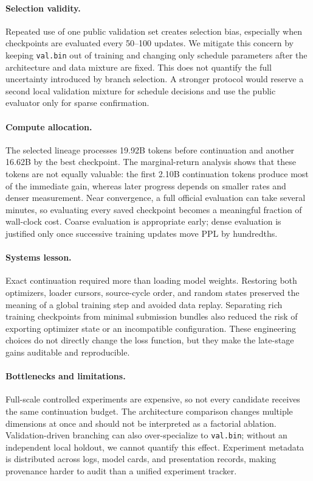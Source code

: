 \documentclass{article}
\begin{document}
\paragraph{Selection validity.}
Repeated use of one public validation set creates selection bias, especially
when checkpoints are evaluated every 50--100 updates. We mitigate this concern
by keeping \texttt{val.bin} out of training and changing only schedule
parameters after the architecture and data mixture are fixed. This does not
quantify the full uncertainty introduced by branch selection. A stronger
protocol would reserve a second local validation mixture for schedule
decisions and use the public evaluator only for sparse confirmation.

\paragraph{Compute allocation.}
The selected lineage processes 19.92B tokens before continuation and another
16.62B by the best checkpoint. The marginal-return analysis shows that these
tokens are not equally valuable: the first 2.10B continuation tokens produce
most of the immediate gain, whereas later progress depends on smaller rates
and denser measurement. Near convergence, a full official evaluation can take
several minutes, so evaluating every saved checkpoint becomes a meaningful
fraction of wall-clock cost. Coarse evaluation is appropriate early; dense
evaluation is justified only once successive training updates move PPL by
hundredths.

\paragraph{Systems lesson.}
Exact continuation required more than loading model weights. Restoring both
optimizers, loader cursors, source-cycle order, and random states preserved the
meaning of a global training step and avoided data replay. Separating rich
training checkpoints from minimal submission bundles also reduced the risk of
exporting optimizer state or an incompatible configuration. These engineering
choices do not directly change the loss function, but they make the late-stage
gains auditable and reproducible.

\paragraph{Bottlenecks and limitations.}
Full-scale controlled experiments are expensive, so not every candidate
receives the same continuation budget. The architecture comparison changes
multiple dimensions at once and should not be interpreted as a factorial
ablation. Validation-driven branching can also over-specialize to
\texttt{val.bin}; without an independent local holdout, we cannot quantify
this effect. Experiment metadata is distributed across logs, model cards, and
presentation records, making provenance harder to audit than a unified
experiment tracker.
\end{document}
